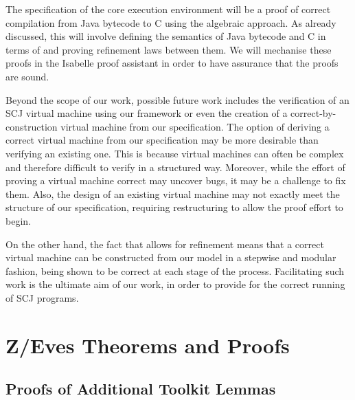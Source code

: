 \documentclass[a4paper,10pt]{report}
\begin{document}
The specification of the core execution environment will be a proof of
correct compilation from Java bytecode to C using the algebraic
approach.
As already discussed, this will involve defining the semantics of Java
bytecode and C in terms of \Circus{} and proving refinement laws
between them.
We will mechanise these proofs in the Isabelle proof assistant in
order to have assurance that the proofs are sound.

Beyond the scope of our work, possible future work includes the
verification of an SCJ virtual machine using our framework or even the
creation of a correct-by-construction virtual machine from our
specification.
The option of deriving a correct virtual machine from our
specification may be more desirable than verifying an existing one.
This is because virtual machines can often be complex and therefore
difficult to verify in a structured way.
Moreover, while the effort of proving a virtual machine correct may
uncover bugs, it may be a challenge to fix them.
Also, the design of an existing virtual machine may not exactly meet
the structure of our specification, requiring restructuring to allow
the proof effort to begin.

On the other hand, the fact that \Circus{} allows for refinement means
that a correct virtual machine can be constructed from our model in a
stepwise and modular fashion, being shown to be correct at each stage
of the process.
Facilitating such work is the ultimate aim of our work, in order to
provide for the correct running of SCJ programs.

\raggedright \printbibliography

\appendix

\chapter{Z/Eves Theorems and Proofs}



\section{Proofs of Additional Toolkit Lemmas}
\label{additional-lemmas-proofs-section}
\scriptsize








\end{document}
